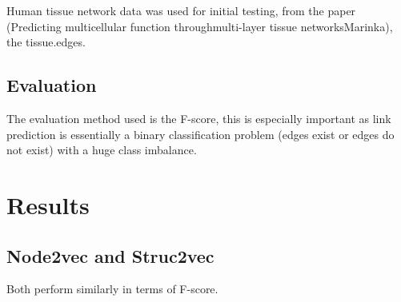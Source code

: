 \documentclass{article}
\begin{document}
    Human tissue network data was used for initial testing, from the paper (Predicting multicellular function throughmulti-layer tissue networksMarinka), the tissue.edges.

    \subsection{Evaluation}
    The evaluation method used is the F-score, this is especially important as link prediction is essentially a binary classification problem (edges exist or edges do not exist) with a huge class imbalance.
    \section{Results}
    \subsection{Node2vec and Struc2vec}
    Both perform similarly in terms of F-score.

\end{document}
